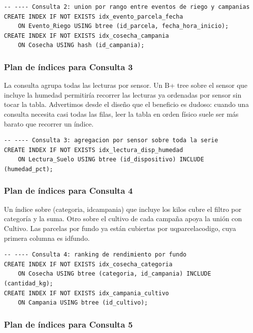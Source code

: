 \documentclass[11pt,letterpaper]{article}
\newcommand{\tbus}{\textunderscore\allowbreak}
\newcommand{\tb}[1]{{\ttfamily\let\_\tbus #1}}
\begin{document}
\begin{lstlisting}[style=sql]
-- ---- Consulta 2: union por rango entre eventos de riego y campanias
CREATE INDEX IF NOT EXISTS idx_evento_parcela_fecha
    ON Evento_Riego USING btree (id_parcela, fecha_hora_inicio);
CREATE INDEX IF NOT EXISTS idx_cosecha_campania
    ON Cosecha USING hash (id_campania);
\end{lstlisting}


\subsubsection{Plan de índices para Consulta 3}

La consulta agrupa todas las lecturas por sensor. Un B+ tree sobre el sensor que incluye la humedad permitiría recorrer las lecturas ya ordenadas por sensor sin tocar la tabla. Advertimos desde el diseño que el beneficio es dudoso: cuando una consulta necesita casi todas las filas, leer la tabla en orden físico suele ser más barato que recorrer un índice.

\begin{lstlisting}[style=sql]
-- ---- Consulta 3: agregacion por sensor sobre toda la serie
CREATE INDEX IF NOT EXISTS idx_lectura_disp_humedad
    ON Lectura_Suelo USING btree (id_dispositivo) INCLUDE (humedad_pct);
\end{lstlisting}


\subsubsection{Plan de índices para Consulta 4}

Un índice sobre (\tb{categoria}, \tb{id\_campania}) que incluye los kilos cubre el filtro por categoría y la suma. Otro sobre el cultivo de cada campaña apoya la unión con \tb{Cultivo}. Las parcelas por fundo ya están cubiertas por \tb{uq\_parcela\_codigo}, cuya primera columna es \tb{id\_fundo}.

\begin{lstlisting}[style=sql]
-- ---- Consulta 4: ranking de rendimiento por fundo
CREATE INDEX IF NOT EXISTS idx_cosecha_categoria
    ON Cosecha USING btree (categoria, id_campania) INCLUDE (cantidad_kg);
CREATE INDEX IF NOT EXISTS idx_campania_cultivo
    ON Campania USING btree (id_cultivo);
\end{lstlisting}


\subsubsection{Plan de índices para Consulta 5}
\end{document}
